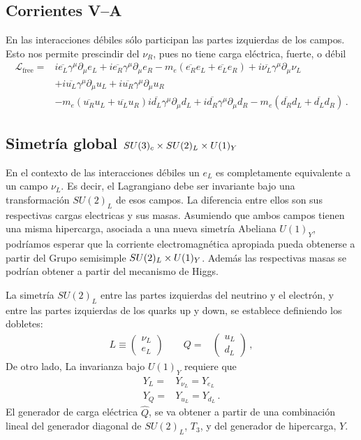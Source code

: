 \begin{frame}
\subsection*{Corrientes V--A}
\label{sec:corrientes-v}
En las interacciones débiles sólo participan las partes izquierdas de los campos. Esto nos permite prescindir del $\nu_R$, pues no tiene carga eléctrica, fuerte, o débil
\begin{align}
  \mathcal{L}_{\text{free}}
=&i\overline{e_L}\gamma^\mu\partial_\mu e_L+i\overline{e_R}\gamma^\mu\partial_\mu e_R-m_e(\overline{e_R}e_L+\overline{e_L}e_R)+
i\overline{\nu_L}\gamma^\mu\partial_\mu\nu_L\nonumber\\
&+i\overline{u_L}\gamma^\mu\partial_\mu u_L+i\overline{u_R}\gamma^\mu\partial_\mu u_R\nonumber\\
&-m_e(\overline{u_R}u_L+\overline{u_L}u_R)
i\overline{d_L}\gamma^\mu\partial_\mu d_L+i\overline{d_R}\gamma^\mu\partial_\mu d_R-m_e(\overline{d_R}d_L+\overline{d_L}d_R)\,.
\end{align}


\subsection*{Simetría global $SU(3)_c\times  SU(2)_L\times  U(1)_Y$}
\label{sec:simetr-glob-su2_l}

En el contexto de las interacciones débiles un $e_L$ es completamente equivalente a un campo $\nu_L$. Es decir, el Lagrangiano debe ser invariante bajo una transformación $SU(2)_L$ de esos campos. La diferencia entre ellos son sus respectivas cargas electricas y sus masas. Asumiendo que ambos campos tienen una misma hipercarga, asociada a una nueva simetría Abeliana $U(1)_Y$, podríamos esperar que la corriente electromagnética apropiada pueda obtenerse a partir del Grupo semisimple $SU(2)_L\times  U(1)_Y$. Además las respectivas masas se podrían obtener a partir del mecanismo de Higgs. 

La simetría $SU(2)_L$ entre las partes izquierdas del neutrino y el electrón, y entre las partes izquierdas de los quarks up y down, se establece  definiendo los dobletes:
  \begin{align}
    L\equiv\begin{pmatrix}
      \nu_L\\
      e_L      
    \end{pmatrix}\qquad   Q=&\begin{pmatrix}
    u_L\\
    d_L
  \end{pmatrix}\,,
  \end{align}
De otro lado, La invarianza bajo $U(1)_Y$ requiere que
\begin{align}
  Y_L=&Y_{\nu_L}=Y_{e_L}\nonumber\\
  Y_Q=&Y_{u_L}=Y_{d_L}\,.
\end{align}
El generador de carga eléctrica $\widehat{Q}$, se va obtener a partir de una combinación lineal del generador diagonal de $SU(2)_L$, $T_3$, y del generador de hipercarga, $Y$.


\end{frame}
